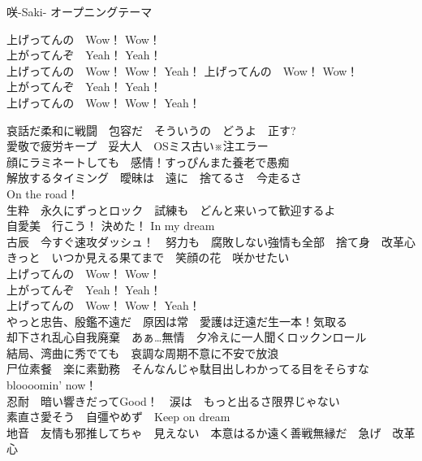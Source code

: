 
{咲-Saki- オープニングテーマ}
{\fontsize{10}{10}\kasho
\begin{multicols}{2}{
  上げってんの　Wow！ Wow！\\
  上がってんぞ　Yeah！ Yeah！\\
  上げってんの　Wow！ Wow！ Yeah！
  \newcolumn
  上げってんの　Wow！ Wow！\\
  上がってんぞ　Yeah！ Yeah！\\
  上げってんの　Wow！ Wow！ Yeah！
  }\end{multicols}
  \vspace{-1.4em}
哀話だ柔和に戦闘　包容だ　そういうの　どうよ　正す?\\
愛敬で疲労キープ　妥大人　OSミス古い$\!$※$\!$注エラー\\[-.3em]

顔にラミネートしても　感情！すっぴんまた養老で愚痴\\
解放するタイミング　曖昧は　遠に　捨てるさ　今走るさ\\[-.3em]

On the road！\\
生粋　永久にずっとロック　試練も　どんと来いって歓迎するよ\\
自愛美　行こう！ 決めた！ In my dream\\
古辰　今すぐ速攻ダッシュ！　努力も　腐敗しない強情も全部　捨て身　改革心\\[-.3em]

きっと　いつか見える果てまで　笑顔の花　咲かせたい\\[-.3em]

上げってんの　Wow！ Wow！\\
上がってんぞ　Yeah！ Yeah！\\
上げってんの　Wow！ Wow！ Yeah！\\

やっと忠告、殷鑑不遠だ　原因は常　愛護は迂遠だ生一本！気取る\\
却下され乱心自我廃棄　あぁ…無情　夕冷えに一人聞くロックンロール\\[-.3em]

結局、湾曲に秀でても　哀調な周期不意に不安で放浪\\
尸位素餐　楽に素勤務　そんなんじゃ駄目出しわかってる目をそらすな\\[-.3em]

bloooomin' now！\\
忍耐　暗い響きだってGood！　涙は　もっと出るさ限界じゃない\\
素直さ愛そう　自彊やめず　Keep on dream\\
地音　友情も邪推してちゃ　見えない　本意はるか遠く善戦無縁だ　急げ　改革心\\[-.3em]

}
